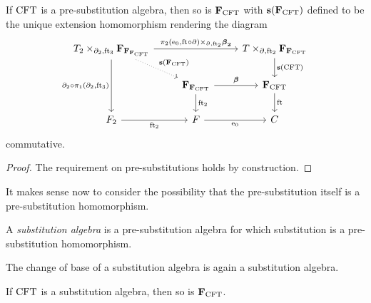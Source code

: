 \begin{lem}
If $\mathrm{CFT}$ is a pre-substitution algebra, then so is $\mathbf{F}_{\mathrm{CFT}}$ with
$\mathbf{s}(\mathbf{F}_{\mathrm{CFT}})$ defined to be the unique extension homomorphism
rendering the diagram
\begin{equation*}
\begin{tikzcd}
\cobesys{\stesyst_2}{\famesys{\famesys{\famesys{\stesys}}}}{\ebd[2]}{\eft[3]}
  \ar[dotted]{dr}{\mathbf{s}(\famesys{\stesys})}
  \ar{rr}{\pullback{\pullbackpr{2}{\ectxext}{\eft\circ\ebd}}{\boldsymbol{\beta}_\mathbf{2}}{\ebd}{\eft[2]}}
  \ar{dd}[swap]{\ebd[2]\circ\pullbackpr{1}{\ebd[2]}{\eft[3]}}
  &
  {}&
\cobesys{\stesyst}{\famesys{\famesys{\stesys}}}{\ebd}{\eft[2]}
  \ar{d}{\mathbf{s}(\stesys)}
  \\
  {}&
\famesys{\famesys{\stesys}}
  \ar{r}{\boldsymbol{\beta}}
  \ar{d}{\eft[2]}
  &
\famesys{\stesys}
  \ar{d}{\eft}
  \\
\stesysf_2
  \ar{r}[swap]{\eft[2]}
  &
\stesysf
  \ar{r}[swap]{\ectxext}
  &
\stesysc
\end{tikzcd}
\end{equation*}
commutative.
\end{lem}

\begin{proof}
The requirement on pre-substitutions holds by construction.
\end{proof}

It makes sense now to consider the possibility that the pre-substitution
itself is a pre-substitution homomorphism.

\begin{defn}
A \emph{substitution algebra} is a pre-substitution algebra for which substitution is
a pre-substitution homomorphism.
\end{defn}

\begin{cor}
The change of base of a substitution algebra is again a substitution algebra.
\end{cor}

\begin{cor}
If $\mathrm{CFT}$ is a substitution algebra, then so is $\mathbf{F}_{\mathrm{CFT}}$.
\end{cor}
